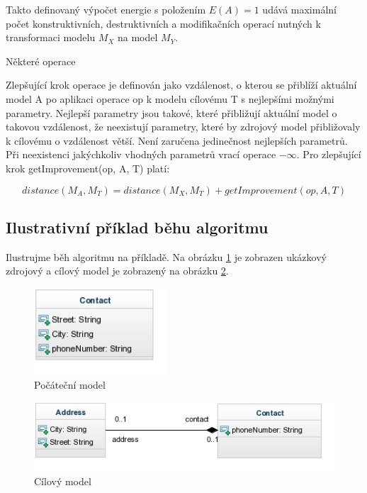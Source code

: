 \documentclass[11pt,twoside,a4paper]{book}
\begin{document}
Takto definovaný výpočet energie s položením $E(A) = 1$ udává maximální počet
konstruktivních, destruktivních a modifikačních operací nutných k transformaci
modelu $M_X$ na model $M_Y$.

Některé operace 

Zlepšující krok operace je definován jako vzdálenost, o kterou se přiblíží
aktuální model A po aplikaci operace op k modelu cílovému T s nejlepšími
možnými parametry. Nejlepší parametry jsou takové, které přibližují
aktuální model o takovou vzdálenost, že neexistují parametry, které by zdrojový
model přibližovaly k cílovému o vzdálenost větší. Není zaručena jedinečnost
nejlepších parametrů. Při neexistenci jakýchkoliv vhodných parametrů
vrací operace $-\infty$. Pro zlepšující krok getImprovement(op, A, T) platí:

$$distance(M_A, M_T) = distance(M_X, M_T) + getImprovement(op, A, T)$$

\subsection{Ilustrativní příklad běhu algoritmu}

Ilustrujme běh algoritmu na příkladě. Na obrázku \ref{fig:exp_contact} je
zobrazen ukázkový zdrojový a cílový model je zobrazený na obrázku
\ref{fig:exp_contact_address}.

\begin{figure}[H]
\begin{center}
\includegraphics[width=5cm]{figures/exp_contact.jpg}
\caption{Počáteční model}
\label{fig:exp_contact}
\end{center}
\end{figure}

\begin{figure}[H]
\begin{center}
\includegraphics[width=12cm]{figures/exp_contact_address.jpg}
\caption{Cílový model}
\label{fig:exp_contact_address}
\end{center}
\end{figure}
\end{document}
